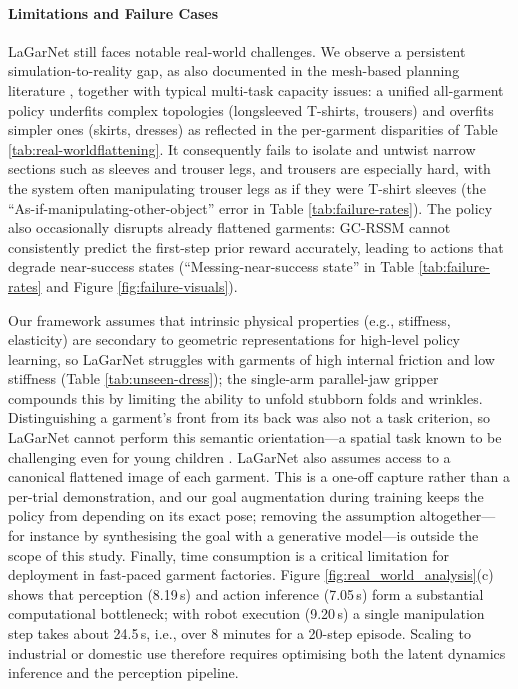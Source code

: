 \documentclass[journal]{IEEEtran}
\newif\ifshowrev\showrevtrue
\newcommand{\rev}[1]{\ifshowrev\textcolor{revblue}{#1}\else#1\fi}
\newif\ifshowirev\showirevtrue
\newcommand{\irev}[1]{\ifshowirev\textcolor{irevgreen}{#1}\else#1\fi}
\newif\ifshowrrev\showrrevtrue
\newcommand{\rrev}[1]{\ifshowrrev\textcolor{rrevred}{#1}\else#1\fi}
\begin{document}
\paragraph{Limitations and Failure Cases}

\rev{LaGarNet still faces notable real-world challenges. We observe a persistent simulation-to-reality gap, as also documented in the mesh-based planning literature \cite{huang2022mesh, lin2022learning}, together with typical multi-task capacity issues: a unified all-garment policy underfits complex topologies (longsleeved T-shirts, trousers) and overfits simpler ones (skirts, dresses) as reflected in the per-garment disparities of Table \ref{tab:real-worldflattening}. It consequently fails to isolate and untwist narrow sections such as sleeves and trouser legs, and trousers are especially hard, with the system often manipulating trouser legs as if they were T-shirt sleeves (the ``As-if-manipulating-other-object'' error in Table \ref{tab:failure-rates}). The policy also occasionally disrupts already flattened garments: GC-RSSM cannot consistently predict the first-step prior reward accurately, leading to actions that degrade near-success states (``Messing-near-success state'' in Table \ref{tab:failure-rates} and Figure \ref{fig:failure-visuals}).}

\rev{Our framework assumes that intrinsic physical properties (e.g., stiffness, elasticity) are secondary to geometric representations for high-level policy learning, so LaGarNet struggles with garments of high internal friction and low stiffness (Table \ref{tab:unseen-dress}); the single-arm parallel-jaw gripper compounds this by limiting the ability to unfold stubborn folds and wrinkles. Distinguishing a garment's front from its back was also not a task criterion, so LaGarNet cannot perform this semantic orientation---a spatial task known to be challenging even for young children \irev{\cite{klein1983predressing}}. LaGarNet also assumes access to a canonical flattened image of each garment\rrev{.} \rrev{T}his is a one-off capture rather than a per-trial demonstration, and our goal augmentation during training keeps the policy from depending on its exact pose\rrev{;} removing the assumption altogether---for instance by synthesising the goal with a generative model---is outside the scope of this study. Finally, time consumption is a critical limitation for deployment in fast-paced garment factories. Figure \ref{fig:real_world_analysis}(c) shows that perception (8.19\,s) and action inference (7.05\,s) form a substantial computational bottleneck; with robot execution (9.20\,s) a single manipulation step takes about 24.5\,s, i.e., over 8 minutes for a 20-step episode. Scaling to industrial or domestic use therefore requires optimising both the latent dynamics inference and the perception pipeline.}
\end{document}
